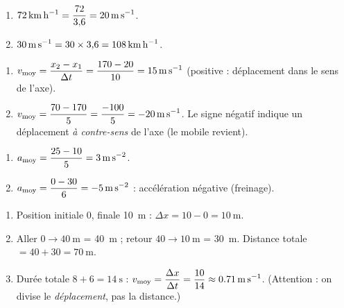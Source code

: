 \documentclass[11pt,a4paper]{article}
\begin{document}

\begin{corrige}
\begin{enumerate}[label=\alph*)]
  \item $\displaystyle \qty{72}{\kilo\metre\per\hour}=\frac{72}{3{,}6}=\qty{20}{\metre\per\second}$.
  \item $\displaystyle \qty{30}{\metre\per\second}=30\times3{,}6=\qty{108}{\kilo\metre\per\hour}$.
\end{enumerate}
\end{corrige}

\begin{corrige}
\begin{enumerate}[label=\alph*)]
  \item $\displaystyle v_{\text{moy}}=\frac{x_2-x_1}{\Delta t}=\frac{170-20}{10}=\qty{15}{\metre\per\second}$ (positive : déplacement dans le sens de l'axe).
  \item $\displaystyle v_{\text{moy}}=\frac{70-170}{5}=\frac{-100}{5}=\qty{-20}{\metre\per\second}$. Le signe négatif indique un déplacement \emph{à contre-sens} de l'axe (le mobile revient).
\end{enumerate}
\end{corrige}

\begin{corrige}
\begin{enumerate}[label=\alph*)]
  \item $\displaystyle a_{\text{moy}}=\frac{25-10}{5}=\qty{3}{\metre\per\second\squared}$.
  \item $\displaystyle a_{\text{moy}}=\frac{0-30}{6}=\qty{-5}{\metre\per\second\squared}$ : accélération négative (freinage).
\end{enumerate}
\end{corrige}

\begin{corrige}
\begin{enumerate}[label=\alph*)]
  \item Position initiale $0$, finale \qty{10}{\metre} : $\Delta x=10-0=\qty{10}{\metre}$.
  \item Aller $0\to\qty{40}{\metre}$ = \qty{40}{\metre} ; retour $40\to\qty{10}{\metre}$ = \qty{30}{\metre}. Distance totale $=40+30=\qty{70}{\metre}$.
  \item Durée totale $8+6=\qty{14}{\second}$ : $\displaystyle v_{\text{moy}}=\frac{\Delta x}{\Delta t}=\frac{10}{14}\approx\qty{0{,}71}{\metre\per\second}$. (Attention : on divise le \emph{déplacement}, pas la distance.)
\end{enumerate}
\end{corrige}
\end{document}
